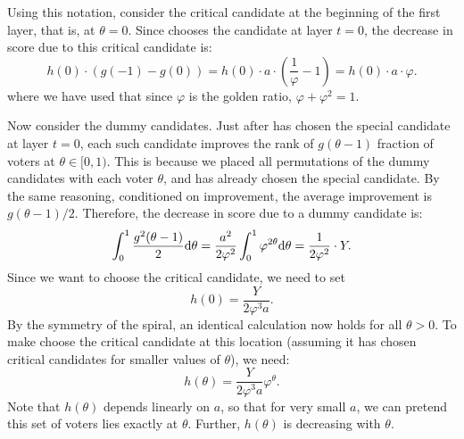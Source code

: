 Using this notation, consider the critical candidate at the beginning of the first layer, that is, at $\theta = 0$. Since \g{} chooses the candidate at layer $t = 0$, the decrease in score due to this critical candidate is:
\begin{equation}
\label{eq:improve_critical}
h(0) \cdot (g(-1) - g(0)) = h(0) \cdot a \cdot \left(\frac{1}{\varphi} - 1\right) = h(0) \cdot a \cdot \varphi.
\end{equation}
where we have used that since $\varphi$ is the golden ratio, $\varphi + \varphi^2 = 1$.

Now consider the dummy candidates. Just after \g{} has chosen the special candidate at layer $t = 0$, each such candidate improves the rank of $g(\theta-1)$ fraction of voters at $\theta \in [0, 1)$. This is because we placed all permutations of the dummy candidates with each voter $\theta$, and \g{} has already chosen the special candidate. By the same reasoning, conditioned on improvement, the average improvement is $g(\theta-1)/2$. Therefore, the decrease in score due to a dummy candidate is: 
\begin{equation}
\label{eq:improve_dummy}
\int_0^{1} \frac{g^2(\theta-1)}{2} \mathrm{d} \theta = \frac{a^2}{2\varphi^2} \int_0^{1} \varphi^{2\theta} \mathrm{d} \theta = \frac{1}{2\varphi^2} \cdot Y.
\end{equation}
Since we want \g{} to choose the critical candidate, we need to set
\[
h(0) = \frac{Y}{2\varphi^3 a}.
\]
By the symmetry of the spiral, an identical calculation now holds for all $\theta > 0$. To make \g{} choose the critical candidate at this location (assuming it has chosen critical candidates for smaller values of $\theta$), we need:
\[
h(\theta) = \frac{Y}{2\varphi^3 a} \varphi^{\theta}.
\]
Note that $h(\theta)$ depends linearly on $a$, so that for very small $a$, we can pretend this set of voters lies exactly at $\theta$. Further, $h(\theta)$ is decreasing with $\theta$.

